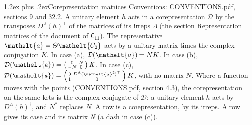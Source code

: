 \documentclass[10pt,a4paper]{article}
\makeatletter
\renewcommand\section{\@startsection{section}{1}{\z@}{-3ex plus -1ex minus -.2ex}%
  {1.2ex plus .2ex}{\normalfont\large\sffamily\bfseries\color{parttitle}}}
\numberwithin{equation}{section}
\newcommand{\eltfont}[1]{{\let\sigma\eltsigma\mathelt{#1}}}
\newcommand{\grp}[1]{\mathsf{#1}}
\newcommand{\elt}[1]{\eltfont{#1}}
\makeatother
\begin{document}
\section{Corepresentation matrices}\label{s:corep_matrices}
Conventions: \href{../../CONVENTIONS.pdf}{CONVENTIONS.pdf}, sections \href{../../../rotation/CONVENTIONS.pdf\#conv.9}{9} and \href{../../CONVENTIONS.pdf\#conv.32.2}{32.2}.
A unitary element $h$ acts in a corepresentation $\mathcal{D}$ by the transposes $D^{\Lambda}(h)^{\top}$ of the matrices of its irreps $\Lambda$ (the section Representation matrices of the document of \href{../../../rotation/data/pdf/C11.pdf}{$\grp{C_{11}}$}). The representative $\elt{a} = \varTheta\elt{C_{2}}$ acts by a unitary matrix times the complex conjugation $K$.
In case (a), $\mathcal{D}(\elt{a}) = NK$. In case (b), $\mathcal{D}(\elt{a}) = \left(\begin{smallmatrix} 0 & N \\ -N & 0 \end{smallmatrix}\right) K$. In case (c), $\mathcal{D}(\elt{a}) = \left(\begin{smallmatrix} 0 & D^{\Lambda}(\elt{a}^2)^{\top} \\ 1 & 0 \end{smallmatrix}\right) K$, with no matrix $N$.
Where a function moves with the points (\href{../../CONVENTIONS.pdf}{CONVENTIONS.pdf}, section \href{../../../rotation/CONVENTIONS.pdf\#conv.4.3}{4.3}), the corepresentation on the same kets is the complex conjugate of $\mathcal{D}$: a unitary element $h$ acts by $D^{\Lambda}(h)^{\dagger}$, and $N^{*}$ replaces $N$.
A row is a corepresentation, by its irreps. A row gives its case and its matrix $N$ (a dash in case (c)).
\end{document}
